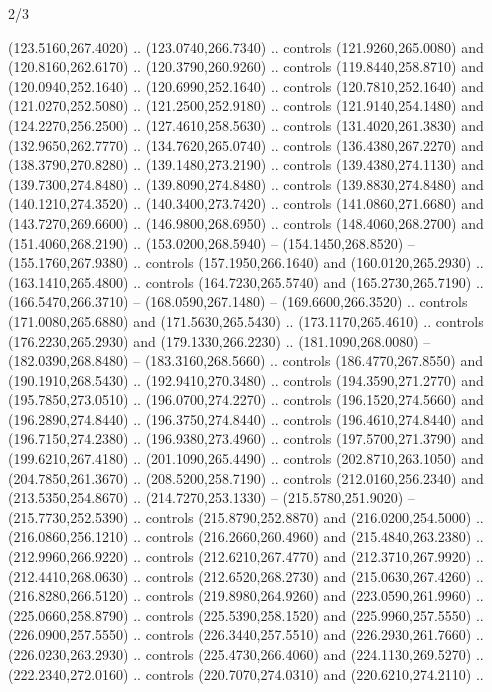 \begin{flagdescription}{2/3}
\begin{scope}[xshift=0.5\flaglength,yshift=0.5\flagwidth,scale=\stretchfactor]
\begin{scope}[scale=0.001645\flagwidth,yshift=65mm,xshift=-63mm]
\begin{scope}[y=0.80pt, x=0.80pt, yscale=-1,]
\begin{scope}[cm={{1.33333,0.0,0.0,1.33333,(0.0,1e-05)}}]
  (123.5160,267.4020) .. (123.0740,266.7340) .. controls (121.9260,265.0080) and
  (120.8160,262.6170) .. (120.3790,260.9260) .. controls (119.8440,258.8710) and
  (120.0940,252.1640) .. (120.6990,252.1640) .. controls (120.7810,252.1640) and
  (121.0270,252.5080) .. (121.2500,252.9180) .. controls (121.9140,254.1480) and
  (124.2270,256.2500) .. (127.4610,258.5630) .. controls (131.4020,261.3830) and
  (132.9650,262.7770) .. (134.7620,265.0740) .. controls (136.4380,267.2270) and
  (138.3790,270.8280) .. (139.1480,273.2190) .. controls (139.4380,274.1130) and
  (139.7300,274.8480) .. (139.8090,274.8480) .. controls (139.8830,274.8480) and
  (140.1210,274.3520) .. (140.3400,273.7420) .. controls (141.0860,271.6680) and
  (143.7270,269.6600) .. (146.9800,268.6950) .. controls (148.4060,268.2700) and
  (151.4060,268.2190) .. (153.0200,268.5940) -- (154.1450,268.8520) --
  (155.1760,267.9380) .. controls (157.1950,266.1640) and (160.0120,265.2930) ..
  (163.1410,265.4800) .. controls (164.7230,265.5740) and (165.2730,265.7190) ..
  (166.5470,266.3710) -- (168.0590,267.1480) -- (169.6600,266.3520) .. controls
  (171.0080,265.6880) and (171.5630,265.5430) .. (173.1170,265.4610) .. controls
  (176.2230,265.2930) and (179.1330,266.2230) .. (181.1090,268.0080) --
  (182.0390,268.8480) -- (183.3160,268.5660) .. controls (186.4770,267.8550) and
  (190.1910,268.5430) .. (192.9410,270.3480) .. controls (194.3590,271.2770) and
  (195.7850,273.0510) .. (196.0700,274.2270) .. controls (196.1520,274.5660) and
  (196.2890,274.8440) .. (196.3750,274.8440) .. controls (196.4610,274.8440) and
  (196.7150,274.2380) .. (196.9380,273.4960) .. controls (197.5700,271.3790) and
  (199.6210,267.4180) .. (201.1090,265.4490) .. controls (202.8710,263.1050) and
  (204.7850,261.3670) .. (208.5200,258.7190) .. controls (212.0160,256.2340) and
  (213.5350,254.8670) .. (214.7270,253.1330) -- (215.5780,251.9020) --
  (215.7730,252.5390) .. controls (215.8790,252.8870) and (216.0200,254.5000) ..
  (216.0860,256.1210) .. controls (216.2660,260.4960) and (215.4840,263.2380) ..
  (212.9960,266.9220) .. controls (212.6210,267.4770) and (212.3710,267.9920) ..
  (212.4410,268.0630) .. controls (212.6520,268.2730) and (215.0630,267.4260) ..
  (216.8280,266.5120) .. controls (219.8980,264.9260) and (223.0590,261.9960) ..
  (225.0660,258.8790) .. controls (225.5390,258.1520) and (225.9960,257.5550) ..
  (226.0900,257.5550) .. controls (226.3440,257.5510) and (226.2930,261.7660) ..
  (226.0230,263.2930) .. controls (225.4730,266.4060) and (224.1130,269.5270) ..
  (222.2340,272.0160) .. controls (220.7070,274.0310) and (220.6210,274.2110) ..

\end{scope}
\end{scope}
\end{scope}
\end{scope}
\end{flagdescription}
